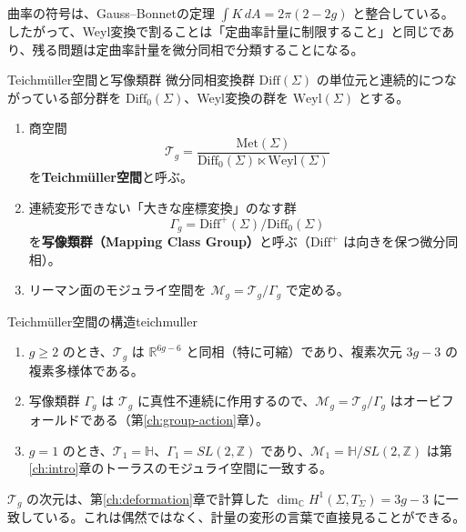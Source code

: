 \documentclass[uplatex, dvipdfmx, book]{jsbook}
\begin{document}
曲率の符号は、Gauss--Bonnetの定理 $\int K\, dA = 2\pi(2 - 2g)$ と整合している。したがって、Weyl変換で割ることは「定曲率計量に制限すること」と同じであり、残る問題は定曲率計量を微分同相で分類することになる。

\begin{mydef}{Teichm\"uller空間と写像類群}{}
微分同相変換群 $\mathrm{Diff}(\Sigma)$ の単位元と連続的につながっている部分群を $\mathrm{Diff}_0(\Sigma)$、Weyl変換の群を $\mathrm{Weyl}(\Sigma)$ とする。
\begin{enumerate}
    \item 商空間
    \begin{equation*}
        \mathcal{T}_g = \frac{\mathrm{Met}(\Sigma)}{\mathrm{Diff}_0(\Sigma) \ltimes \mathrm{Weyl}(\Sigma)}
    \end{equation*}
    を\textbf{Teichm\"uller空間}と呼ぶ。
    \item 連続変形できない「大きな座標変換」のなす群
    \begin{equation*}
        \Gamma_g = \mathrm{Diff}^+(\Sigma) / \mathrm{Diff}_0(\Sigma)
    \end{equation*}
    を\textbf{写像類群（Mapping Class Group）}と呼ぶ（$\mathrm{Diff}^+$ は向きを保つ微分同相）。
    \item リーマン面のモジュライ空間を $\mathcal{M}_g = \mathcal{T}_g / \Gamma_g$ で定める。
\end{enumerate}
\end{mydef}

\begin{myprop}{Teichm\"uller空間の構造}{teichmuller}
\begin{enumerate}
    \item $g \ge 2$ のとき、$\mathcal{T}_g$ は $\mathbb{R}^{6g-6}$ と同相（特に可縮）であり、複素次元 $3g - 3$ の複素多様体である。
    \item 写像類群 $\Gamma_g$ は $\mathcal{T}_g$ に真性不連続に作用するので、$\mathcal{M}_g = \mathcal{T}_g / \Gamma_g$ はオービフォールドである（第\ref{ch:group-action}章）。
    \item $g = 1$ のとき、$\mathcal{T}_1 = \mathbb{H}$、$\Gamma_1 = SL(2, \mathbb{Z})$ であり、$\mathcal{M}_1 = \mathbb{H}/SL(2, \mathbb{Z})$ は第\ref{ch:intro}章のトーラスのモジュライ空間に一致する。
\end{enumerate}
\end{myprop}

$\mathcal{T}_g$ の次元は、第\ref{ch:deformation}章で計算した $\dim_{\mathbb{C}} H^1(\Sigma, T_\Sigma) = 3g - 3$ に一致している。これは偶然ではなく、計量の変形の言葉で直接見ることができる。
\end{document}
